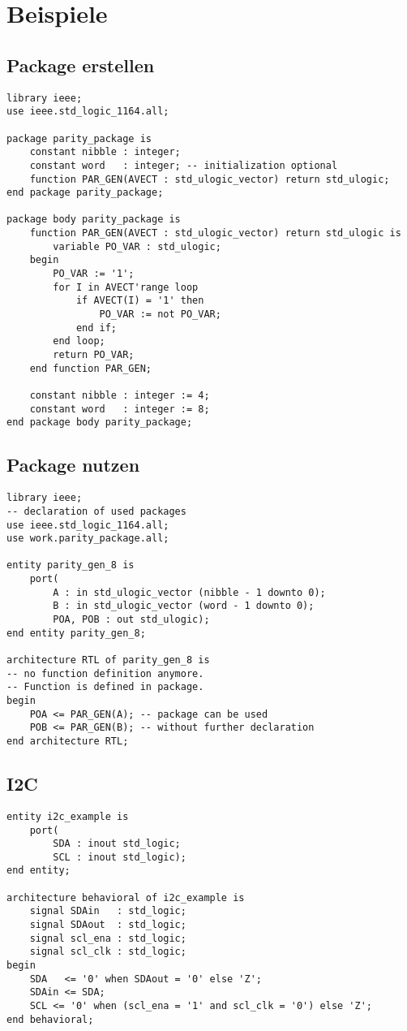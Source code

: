 \section{Beispiele}

\subsection{Package erstellen}

\begin{lstlisting}
library ieee;
use ieee.std_logic_1164.all;

package parity_package is
	constant nibble : integer; 
	constant word	: integer; -- initialization optional
	function PAR_GEN(AVECT : std_ulogic_vector) return std_ulogic;
end package parity_package;

package body parity_package is
	function PAR_GEN(AVECT : std_ulogic_vector) return std_ulogic is
		variable PO_VAR : std_ulogic;
	begin
		PO_VAR := '1';
		for I in AVECT'range loop
			if AVECT(I) = '1' then
				PO_VAR := not PO_VAR;
			end if;
		end loop;
		return PO_VAR;
	end function PAR_GEN;
	
	constant nibble : integer := 4;
	constant word	: integer := 8;
end package body parity_package;
\end{lstlisting}
\vspace{-20px}


\subsection{Package nutzen}
\begin{lstlisting}
library ieee;
-- declaration of used packages
use ieee.std_logic_1164.all;
use work.parity_package.all;
	
entity parity_gen_8 is
	port(
		A : in std_ulogic_vector (nibble - 1 downto 0);
		B : in std_ulogic_vector (word - 1 downto 0);
		POA, POB : out std_ulogic);
end entity parity_gen_8;

architecture RTL of parity_gen_8 is
-- no function definition anymore.
-- Function is defined in package.
begin
	POA <= PAR_GEN(A); -- package can be used
	POB <= PAR_GEN(B); -- without further declaration
end architecture RTL;
\end{lstlisting}

\subsection{I2C}
\begin{lstlisting}
entity i2c_example is
	port(
		SDA : inout std_logic;
		SCL : inout std_logic);
end entity;

architecture behavioral of i2c_example is
	signal SDAin   : std_logic;
	signal SDAout  : std_logic;
	signal scl_ena : std_logic;
	signal scl_clk : std_logic;
begin
	SDA   <= '0' when SDAout = '0' else 'Z';
	SDAin <= SDA;
	SCL <= '0' when (scl_ena = '1' and scl_clk = '0') else 'Z';
end behavioral;
\end{lstlisting}


